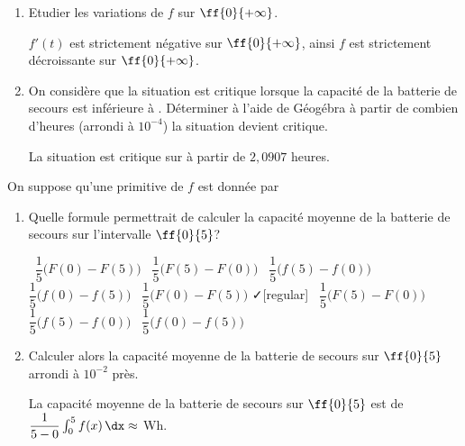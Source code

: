 \begin{enumerate}[resume=monDS]

        \item Etudier les variations de $f$ sur $\ff{0}{+\infty}$.
        \begin{blocvisiblex}[height=5]
        {\quad}
        $f'(t)$ est strictement négative sur $\ff{0}{+\infty}$, ainsi $f$ est strictement décroissante sur $\ff{0}{+\infty}$.

         \end{blocvisiblex}

         \medskip
         \item On considère que la situation est critique lorsque la capacité de la batterie de secours est inférieure à . Déterminer à l'aide de Géogébra à partir de combien d'heures (arrondi à $10^{-4}$) la situation devient critique.
            \begin{blocvisiblex}[height=1.2]
            {\quad}
            La situation est critique sur à partir de $2,0907$ heures.
             \end{blocvisiblex}
\end{enumerate}

             \medskip
             On suppose qu'une primitive de $f$ est donnée par 
\begin{enumerate}[resume=monDS]

             \medskip

                 \item Quelle formule permettrait de calculer la capacité moyenne de la batterie de secours sur l'intervalle $\ff{0}{5}$?
                    \begin{blocvisiblex}[height=1.5]
    {
    \faSquare[regular] \, $\dfrac{1}{5}\big(F(0) - F(5)\big)$ \hfill \faSquare[regular] \, $\dfrac{1}{5}\big(F(5) - F(0)\big)$ \hfill \faSquare[regular] \, $\dfrac{1}{5}\big(f(5)-f(0)\big)$ \hfill \faSquare[regular] \, $\dfrac{1}{5}\big(f(0)-f(5)\big)$ \hspace{1cm} 
 }         
    \faSquare[regular] \, $\dfrac{1}{5}\big(F(0) - F(5)\big)$ \hfill \faCheck[regular] \, $\dfrac{1}{5}\big(F(5) - F(0)\big)$ \hfill \faSquare[regular] \, $\dfrac{1}{5}\big(f(5)-f(0)\big)$ \hfill \faSquare[regular] \, $\dfrac{1}{5}\big(f(0)-f(5)\big)$ \hspace{1cm} 
    \end{blocvisiblex}

                 \medskip
                 \item Calculer alors la capacité moyenne de la batterie de secours sur $\ff{0}{5}$ arrondi à $10^{-2}$ près.
                    \begin{blocvisiblex}[height=1.5]
                    {\quad}
                    La capacité moyenne de la batterie de secours sur $\ff{0}{5}$ est de $\dfrac{1}{5-0}\int_0^5 f(x) \, \dx\approx $ Wh.
                     \end{blocvisiblex}
            
    \end{enumerate}


